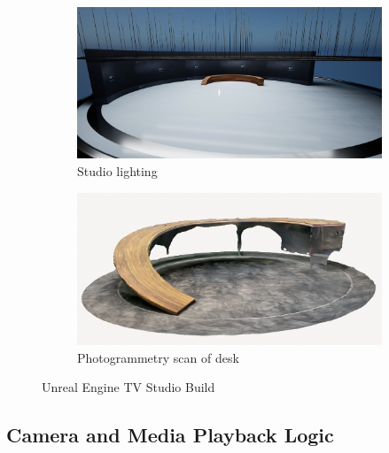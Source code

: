\documentclass[
  a4paper,  %
  twoside,  %
  bibliography=totoc,
  headsepline,
  cleardoublepage=empty,
  parskip=half,
  draft=false
]{scrbook}
\begin{document}
\begin{figure}[h]
  \begin{subfigure}{0.45\textwidth}
    \includegraphics[width=\linewidth]{graphics/unreal-engine/studio/studio-totale.png}
    \caption{Studio lighting}
  \end{subfigure}
  \begin{subfigure}{0.45\textwidth}
    \includegraphics[width=\linewidth]{graphics/unreal-engine/studio/Photogrammetry-Desk.png}
    \caption{Photogrammetry scan of desk}
    \label{fig:photogrammetry-desk}
  \end{subfigure}

  \caption{Unreal Engine TV Studio Build}
  \label{fig:ue-studio-build}
\end{figure}

\subsection*{Camera and Media Playback Logic} 
\end{document}
